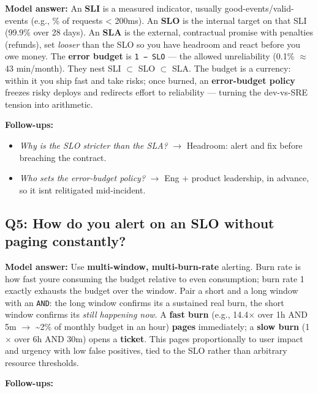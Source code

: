 \documentclass[11pt]{article}
\providecommand{\tightlist}{\setlength{\itemsep}{1pt}\setlength{\parskip}{0pt}}
\begin{document}
\textbf{Model answer:} An \textbf{SLI} is a measured indicator, usually good-events/valid-events (e.g., \% of requests \textless{} 200ms). An \textbf{SLO} is the internal target on that SLI (99.9\% over 28 days). An \textbf{SLA} is the external, contractual promise with penalties (refunds), set \emph{looser} than the SLO so you have headroom and react before you owe money. The \textbf{error budget} is \texttt{1\ −\ SLO} --- the allowed unreliability (0.1\% \(\approx\) 43 min/month). They nest SLI \(\subset\) SLO \(\subset\) SLA. The budget is a currency: within it you ship fast and take risks; once burned, an \textbf{error-budget policy} freezes risky deploys and redirects effort to reliability --- turning the dev-vs-SRE tension into arithmetic.

\textbf{Follow-ups:}

\begin{itemize}
\tightlist
\item
  \emph{Why is the SLO stricter than the SLA?} \(\rightarrow\) Headroom: alert and fix before breaching the contract.
\item
  \emph{Who sets the error-budget policy?} \(\rightarrow\) Eng + product leadership, in advance, so it isn\textquotesingle t relitigated mid-incident.
\end{itemize}

\subsection{Q5: How do you alert on an SLO without paging constantly?}\label{q5-how-do-you-alert-on-an-slo-without-paging-constantly}

\textbf{Model answer:} Use \textbf{multi-window, multi-burn-rate} alerting. Burn rate is how fast you\textquotesingle re consuming the budget relative to even consumption; burn rate 1 exactly exhausts the budget over the window. Pair a short and a long window with an \texttt{AND}: the long window confirms it\textquotesingle s a sustained real burn, the short window confirms it\textquotesingle s \emph{still happening now}. A \textbf{fast burn} (e.g., 14.4\(\times\) over 1h AND 5m \(\rightarrow\) \textasciitilde2\% of monthly budget in an hour) \textbf{pages} immediately; a \textbf{slow burn} (1\(\times\) over 6h AND 30m) opens a \textbf{ticket}. This pages proportionally to user impact and urgency with low false positives, tied to the SLO rather than arbitrary resource thresholds.

\textbf{Follow-ups:}
\end{document}

